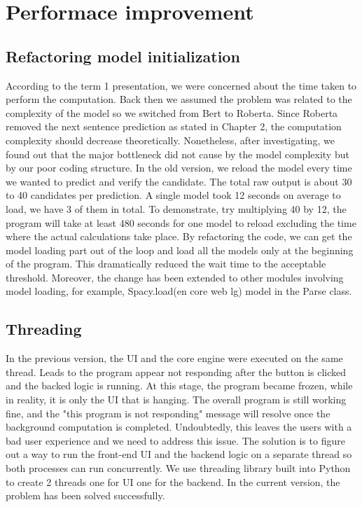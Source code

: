 \documentclass[12pt,oneside,openright,a4paper]{cpe-english-project}
\begin{document}
\section{Performace improvement}
\subsection{Refactoring model initialization }
According to the term 1 presentation, we were concerned about the time taken to perform the computation. Back then we assumed the problem was related to the complexity of the model so we switched from Bert to Roberta. Since Roberta removed the next sentence prediction as stated in Chapter 2, the computation complexity should decrease theoretically. Nonetheless, after investigating, we found out that the major bottleneck did not cause by the model complexity but by our poor coding structure. In the old version, we reload the model every time we wanted to predict and verify the candidate. The total raw output is about 30 to 40 candidates per prediction. A single model took 12 seconds on average to load, we have 3 of them in total. To demonstrate, try multiplying 40 by 12, the program will take at least 480 seconds for one model to reload excluding the time where the actual calculations take place. By refactoring the code, we can get the model loading part out of the loop and load all the models only at the beginning of the program. This dramatically reduced the wait time to the acceptable threshold. Moreover, the change has been extended to other modules involving model loading, for example, Spacy.load(en core web lg) model in the Parse class.

\subsection{Threading}
In the previous version, the UI and the core engine were executed on the same thread. Leads to the program appear not responding after the button is clicked and the backed logic is running. At this stage, the program became frozen, while in reality, it is only the UI that is hanging. The overall program is still working fine, and the "this program is not responding" message will resolve once the background computation is completed. Undoubtedly, this leaves the users with a bad user experience and we need to address this issue. The solution is to figure out a way to run the front-end UI and the backend logic on a separate thread so both processes can run concurrently. We use threading library built into Python to create 2 threads one for UI one for the backend. In the current version, the problem has been solved successfully.
\end{document}
